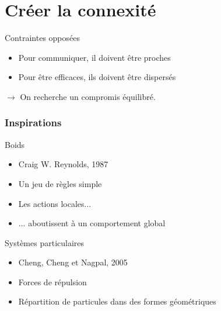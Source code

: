 \documentclass{beamer}
\begin{document}
\begin{frame}
  \begin{figure}
    \centering
    
  \end{figure}
\end{frame}

\section{Créer la connexité}

\begin{frame}

  \begin{block}{Contraintes opposées}
    \begin{itemize}
    \item{Pour communiquer, il doivent être proches}
    \item{Pour être efficaces, ils doivent être dispersés}
    \end{itemize}
  \end{block}

  \vfill

  $\rightarrow$ On recherche un compromis équilibré.

\end{frame}

\begin{frame}

  \frametitle{Inspirations}

  \begin{block}{Boids}
    \begin{itemize}
    \item{Craig W. Reynolds, 1987}
    \item{Un jeu de règles simple}
    \item{Les actions locales...}
    \item{... aboutissent à un comportement global}
    \end{itemize}
  \end{block}

  \vfill

  \begin{block}{Systèmes particulaires}
    \begin{itemize}
    \item{Cheng, Cheng et Nagpal, 2005}
    \item{Forces de répulsion}
    \item{Répartition de particules dans des formes géométriques}
    \end{itemize}
  \end{block}

\end{frame}
\end{document}
